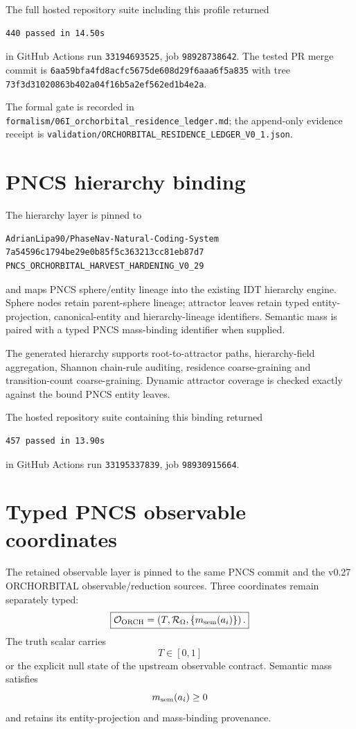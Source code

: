 The full hosted repository suite including this profile returned
\begin{verbatim}
440 passed in 14.50s
\end{verbatim}
in GitHub Actions run \texttt{33194693525}, job \texttt{98928738642}. The tested PR merge commit is
\texttt{6aa59bfa4fd8acfc5675de608d29f6aaa6f5a835}
with tree
\texttt{73f3d31020863b402a04f16b5a2ef562ed1b4e2a}.

The formal gate is recorded in \texttt{formalism/06I\_orchorbital\_residence\_ledger.md}; the append-only evidence receipt is \texttt{validation/ORCHORBITAL\_RESIDENCE\_LEDGER\_V0\_1.json}.

\section{PNCS hierarchy binding}

The hierarchy layer is pinned to
\begin{verbatim}
AdrianLipa90/PhaseNav-Natural-Coding-System
7a54596c1794be29e0b85f5c363213cc81eb87d7
PNCS_ORCHORBITAL_HARVEST_HARDENING_V0_29
\end{verbatim}
and maps PNCS sphere/entity lineage into the existing IDT hierarchy engine. Sphere nodes retain parent-sphere lineage; attractor leaves retain typed entity-projection, canonical-entity and hierarchy-lineage identifiers. Semantic mass is paired with a typed PNCS mass-binding identifier when supplied.

The generated hierarchy supports root-to-attractor paths, hierarchy-field aggregation, Shannon chain-rule auditing, residence coarse-graining and transition-count coarse-graining. Dynamic attractor coverage is checked exactly against the bound PNCS entity leaves.

The hosted repository suite containing this binding returned
\begin{verbatim}
457 passed in 13.90s
\end{verbatim}
in GitHub Actions run \texttt{33195337839}, job \texttt{98930915664}.

\section{Typed PNCS observable coordinates}

The retained observable layer is pinned to the same PNCS commit and the v0.27 ORCHORBITAL observable/reduction sources. Three coordinates remain separately typed:
\[
\boxed{
\mathcal O_{\rm ORCH}
=
\left(
T,
\mathcal R_{\Omega},
\{m_{\rm sem}(a_i)\}
\right).
}
\]
The truth scalar carries
\[
T\in[0,1]
\]
or the explicit null state of the upstream observable contract. Semantic mass satisfies
\[
m_{\rm sem}(a_i)\ge0
\]
and retains its entity-projection and mass-binding provenance.

